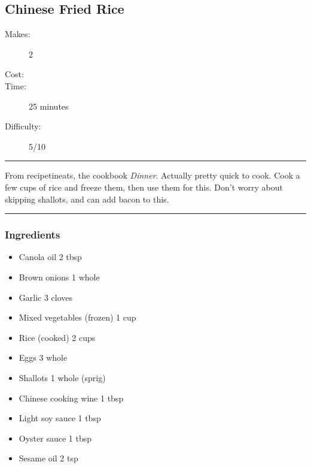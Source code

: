 \documentclass[]{article}
\begin{document}
\subsection*{\center\huge Chinese Fried Rice}
\begin{description}
\item[Makes:] 2 
\item[Cost:] \textdollar
\item[Time:] 25 minutes
\item[Difficulty:] 5/10
\end{description}
\vspace{0.2cm}\hrule\vspace{0.5cm}
\begin{adjustwidth}{0.5 cm}{0.5 cm}

From recipetineats, the cookbook \textit{Dinner}. Actually pretty quick to cook. Cook a few cups of rice and freeze them, then use them for this. Don't worry about skipping shallots, and can add bacon to this. \hfill{}\color{black}

\end{adjustwidth}
\vspace{0.5cm}\hrule
\subsubsection*{\Large Ingredients}
\begin{multicols}{2}
\begin{itemize}
 \item Canola oil \hfill 2 tbsp
 \item Brown onions \hfill 1 whole
 \item Garlic \hfill 3 cloves
 \item Mixed vegetables (frozen) \hfill 1 cup
 \item Rice (cooked) \hfill 2 cups
 \item Eggs \hfill 3 whole
 \item Shallots \hfill 1 whole (sprig)
 \item Chinese cooking wine \hfill 1 tbsp
 \item Light soy sauce \hfill 1 tbsp
 \item Oyster sauce \hfill 1 tbsp
 \item Sesame oil \hfill 2 tsp
\end{itemize}
\end{multicols}
\end{document}
